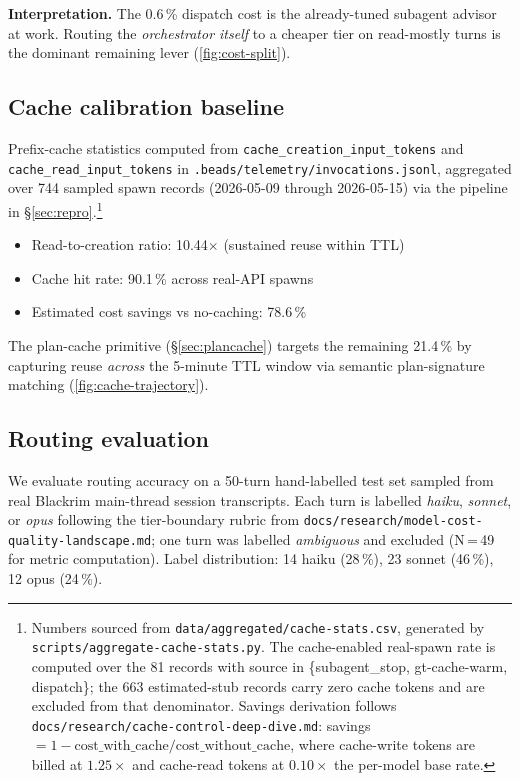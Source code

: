\textbf{Interpretation.} The 0.6\,\% dispatch cost is the
already-tuned subagent advisor at work. Routing the
\emph{orchestrator itself} to a cheaper tier on read-mostly turns
is the dominant remaining lever (\cref{fig:cost-split}).



\subsection{Cache calibration baseline}
\label{sec:prefixcache-eval}

Prefix-cache statistics computed from \texttt{cache\_creation\_input\_tokens}
and \texttt{cache\_read\_input\_tokens} in
\texttt{.beads/telemetry/invocations.jsonl}, aggregated over 744 sampled
spawn records (2026-05-09 through 2026-05-15) via the pipeline in
\S\ref{sec:repro}.\footnote{Numbers sourced from
\texttt{data/aggregated/cache-stats.csv}, generated by
\texttt{scripts/aggregate-cache-stats.py}. The cache-enabled real-spawn rate
is computed over the 81 records with source in \{subagent\_stop,
gt-cache-warm, dispatch\}; the 663 estimated-stub records carry zero cache
tokens and are excluded from that denominator.
Savings derivation follows \texttt{docs/research/cache-control-deep-dive.md}:
savings $= 1 - \text{cost\_with\_cache} / \text{cost\_without\_cache}$,
where cache-write tokens are billed at $1.25\times$ and cache-read tokens
at $0.10\times$ the per-model base rate.}

\begin{itemize}
  \item Read-to-creation ratio: 10.44\(\times\) (sustained reuse within TTL)
  \item Cache hit rate: 90.1\,\% across real-API spawns
  \item Estimated cost savings vs no-caching: 78.6\,\%
\end{itemize}

The plan-cache primitive (§\ref{sec:plancache}) targets the
remaining 21.4\,\% by capturing reuse \emph{across} the 5-minute
TTL window via semantic plan-signature matching (\cref{fig:cache-trajectory}).



\subsection{Routing evaluation}

We evaluate routing accuracy on a 50-turn hand-labelled test set sampled from
real Blackrim main-thread session transcripts.
Each turn is labelled \emph{haiku}, \emph{sonnet}, or \emph{opus} following the
tier-boundary rubric from \texttt{docs/research/model-cost-quality-landscape.md};
one turn was labelled \emph{ambiguous} and excluded (N\,=\,49 for metric computation).
Label distribution: 14 haiku (28\,\%), 23 sonnet (46\,\%), 12 opus (24\,\%).

